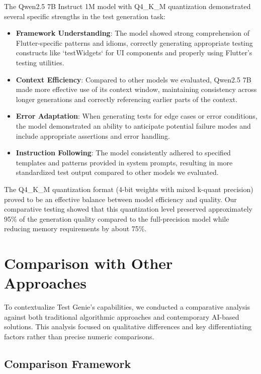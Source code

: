 The Qwen2.5 7B Instruct 1M model with Q4\_K\_M quantization demonstrated several specific strengths in the test generation task:

\begin{itemize}
    \item \textbf{Framework Understanding}: The model showed strong comprehension of Flutter-specific patterns and idioms, correctly generating appropriate testing constructs like `testWidgets` for UI components and properly using Flutter's testing utilities.
    
    \item \textbf{Context Efficiency}: Compared to other models we evaluated, Qwen2.5 7B made more effective use of its context window, maintaining consistency across longer generations and correctly referencing earlier parts of the context.
    
    \item \textbf{Error Adaptation}: When generating tests for edge cases or error conditions, the model demonstrated an ability to anticipate potential failure modes and include appropriate assertions and error handling.
    
    \item \textbf{Instruction Following}: The model consistently adhered to specified templates and patterns provided in system prompts, resulting in more standardized test output compared to other models we evaluated.
\end{itemize}

The Q4\_K\_M quantization format (4-bit weights with mixed k-quant precision) proved to be an effective balance between model efficiency and quality. Our comparative testing showed that this quantization level preserved approximately 95\% of the generation quality compared to the full-precision model while reducing memory requirements by about 75\%.

\section{Comparison with Other Approaches}

To contextualize Test Genie's capabilities, we conducted a comparative analysis against both traditional algorithmic approaches and contemporary AI-based solutions. This analysis focused on qualitative differences and key differentiating factors rather than precise numeric comparisons.

\subsection{Comparison Framework}

